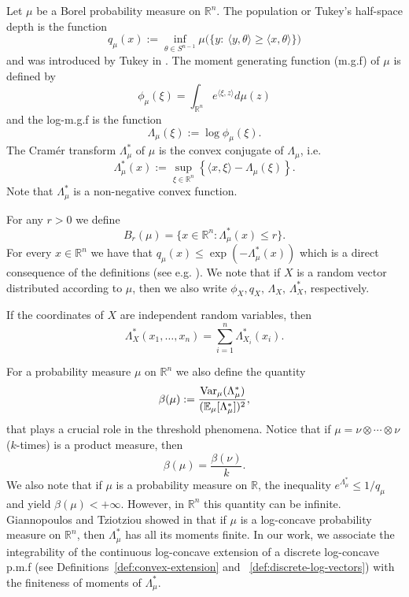 \documentclass[11pt,a4paper]{article} %
\theoremstyle{definition}
\theoremstyle{remark}
\newcommand{\E}{\mathbb{E}}
\newcommand{\1}{\mathds{1}}
\newcommand{\ls}{\le}
\begin{document}
Let $\mu$ be a Borel probability measure on $\mathbb R^n$. The population or Tukey's half-space depth is the function $$q_\mu(x):=\inf_{\theta\in S^{n-1}} \mu\big(\{y:\ \langle y,\theta\rangle\ge \langle x,\theta\rangle\}\big)$$ and was introduced by Tukey in \cite{Tukey-1975}.  The moment generating function (m.g.f) of $\mu$ is defined by
\begin{equation*}\phi_{\mu }(\xi )=\int_{{\mathbb R}^n}e^{\langle\xi
,z\rangle }d\mu(z)\end{equation*}
and the log-m.g.f is the function $$\Lambda_{\mu}(\xi):=\log \phi_{\mu}(\xi).$$
The Cram\'{e}r transform $\Lambda_{\mu}^{\ast }$ of $\mu $ is the convex conjugate of $\Lambda_{\mu}$, i.e.
\begin{equation*}\Lambda_{\mu }^{\ast }(x):= \sup_{\xi\in {\mathbb R}^n} \left\{ \langle x, \xi\rangle - \Lambda_{\mu }(\xi )\right\}.\end{equation*}
Note that $\Lambda_{\mu}^{\ast}$ is a non-negative convex function.

For any $r>0$ we define
$$B_r(\mu)=\{x\in\mathbb{R}^n:\Lambda_{\mu}^{\ast}(x)\ls r\}.$$
For every $x \in \mathbb{R}^n$ we have that $q_{\mu } (x)\ls\exp (-\Lambda_{\mu }^{\ast }(x))$ which is a direct
consequence of the definitions (see e.g. \cite[Lemma~3.1]{BGP}). We note that if $X$ is a random vector distributed according to $\mu$, then we also write $\phi_X, q_X, \, \Lambda_X,\, \Lambda_X^\ast $, respectively.



If the coordinates of $X$ are independent random variables, then $$\Lambda_X^\ast(x_1,\ldots,x_n)=\sum_{i=1}^n \Lambda_{X_i}^{\ast}(x_i).$$

For a probability measure $\mu$ on $\mathbb{R}^n$ we also define the quantity $$\beta(\mu):= \frac{{\rm Var}_{\mu} (\Lambda_{\mu}^\ast) }{(\E_{\mu}[\Lambda_{\mu}^\ast])^2},$$ that plays a crucial role in the threshold phenomena. Notice that if $\mu=\nu \otimes\cdots \otimes \nu \,$ ($k$-times) is a product measure, then $$\beta(\mu)=\frac{\beta(\nu)}{k}.$$ We also note that if $\mu$ is a probability measure on $\mathbb{R}$, the inequality $e^{\Lambda_{\mu}^\ast} \leq 1/q_\mu$ and \cite[Proposition 3.2 b)]{BC} yield  $\beta(\mu)<+\infty$. However, in $\mathbb{R}^n$ this quantity can be infinite. Giannopoulos and Tziotziou showed in \cite{Giannop-Tziotziou} that if $\mu$ is a log-concave probability measure on $\mathbb{R}^n$, then $\Lambda_{\mu}^\ast$ has all its moments finite. In our work, we associate the integrability of the continuous log-concave extension of a discrete log-concave p.m.f (see Definitions~\ref{def:convex-extension} and ~\ref{def:discrete-log-vectors}) with the finiteness of moments of $\Lambda_{\mu}^\ast$.
\end{document}
